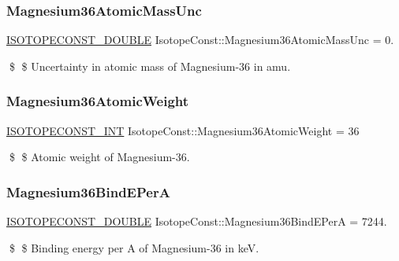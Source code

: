 \subsubsection{\texorpdfstring{Magnesium36\+Atomic\+Mass\+Unc}{Magnesium36AtomicMassUnc}}
{\footnotesize\ttfamily \mbox{\hyperlink{group___isotope_const-_macros_ga8f45a7272ce02c0b4c65c44636ed719a}{I\+S\+O\+T\+O\+P\+E\+C\+O\+N\+S\+T\+\_\+\+D\+O\+U\+B\+LE}} Isotope\+Const\+::\+Magnesium36\+Atomic\+Mass\+Unc = 0.}

\$ \$ Uncertainty in atomic mass of Magnesium-\/36 in amu. \mbox{\label{group___isotope_const-_magnesium-_mg36_ga4fe6133ea7cf20b57244734fefa2544a}} 
\subsubsection{\texorpdfstring{Magnesium36\+Atomic\+Weight}{Magnesium36AtomicWeight}}
{\footnotesize\ttfamily \mbox{\hyperlink{group___isotope_const-_macros_ga5f18360b3e99483a35c32d789e62621c}{I\+S\+O\+T\+O\+P\+E\+C\+O\+N\+S\+T\+\_\+\+I\+NT}} Isotope\+Const\+::\+Magnesium36\+Atomic\+Weight = 36}

\$ \$ Atomic weight of Magnesium-\/36. \mbox{\label{group___isotope_const-_magnesium-_mg36_ga79db19304f315d294db0143e8575d9b2}} 
\subsubsection{\texorpdfstring{Magnesium36\+Bind\+E\+PerA}{Magnesium36BindEPerA}}
{\footnotesize\ttfamily \mbox{\hyperlink{group___isotope_const-_macros_ga8f45a7272ce02c0b4c65c44636ed719a}{I\+S\+O\+T\+O\+P\+E\+C\+O\+N\+S\+T\+\_\+\+D\+O\+U\+B\+LE}} Isotope\+Const\+::\+Magnesium36\+Bind\+E\+PerA = 7244.}

\$ \$ Binding energy per A of Magnesium-\/36 in keV. \mbox{\label{group___isotope_const-_magnesium-_mg36_ga9e554540645e87e39ec2f5f8cfb657ea}} 
